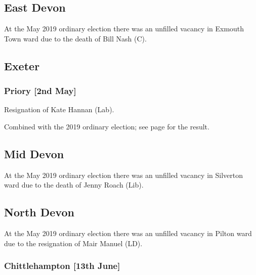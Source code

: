 \documentclass[a4paper,openany]{book}
\begin{document}
\begin{resultsiii}
\subsection*{East Devon}

At the May 2019 ordinary election there was an unfilled vacancy in Exmouth Town ward due to the death of Bill Nash (C).

\subsection*{Exeter}

\subsubsection*{Priory \hspace*{\fill}\nolinebreak[1]%
	\enspace\hspace*{\fill}
	[2nd May]}


Resignation of Kate Hannan (Lab).

Combined with the 2019 ordinary election; see page \pageref{ExeterPriory} for the result.

\subsection*{Mid Devon}

At the May 2019 ordinary election there was an unfilled vacancy in Silverton ward due to the death of Jenny Roach (Lib).

\subsection*{North Devon}

At the May 2019 ordinary election there was an unfilled vacancy in Pilton ward due to the resignation of Mair Manuel (LD).

\subsubsection*{Chittlehampton \hspace*{\fill}\nolinebreak[1]%
	\enspace\hspace*{\fill}
	[13th June]}


\end{resultsiii}
\end{document}
